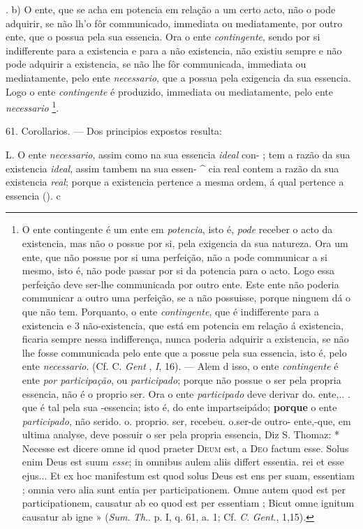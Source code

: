 . b) O ente, que se acha em potencia em relação a um certo acto, não o pode adquirir, se não lh'o fôr communicado, immediata ou mediatamente, por outro ente, que o possua pela sua essencia. Ora o ente \emph{contingente}, sendo por si indifferente para a existencia e para a não existencia, não existiu sempre e não pode adquirir a existencia, se não lhe fôr communicada, immediata ou mediatamente, pelo ente \emph{necessario}, que a possua pela exigencia da sua essencia. Logo o ente \emph{contingente} é produzido, immediata ou mediatamente, pelo ente \emph{necessario} \footnote{O ente contingente é um ente em \emph{potencia}, isto é, \emph{pode} receber o acto da existencia, mas não o possue por si, pela exigencia da sua natureza. Ora um ente, que não possue por si uma perfeição, não a pode communicar a si mesmo, isto é, não pode passar por si da potencia para o acto. Logo essa perfeição deve ser-lhe communicada por outro ente. Este ente não poderia communicar a outro uma perfeição, se a não possuisse, porque ninguem dá o que não tem. Porquanto, o ente \emph{contingente}, que é indifferente para a existencia e 3 não-existencia, que está em potencia em relação á existencia, ficaria sempre nessa indifferença, nunca poderia adquirir a existencia, se não lhe fosse communicada pelo ente que a possue pela sua essencia, isto é, pelo ente \emph{necessario}. (Cf. C. \emph{Gent} , \emph{I}, 16). --- Alem d isso, o ente \emph{contingente} é ente \emph{por participação}, ou \emph{participado}; porque não possue o ser pela propria essencia, não é o proprio ser. Ora o ente \emph{participado} deve derivar do. ente,.. . que é tal pela sua -essencia; isto é, do ente impartseipádo; \textbf{porque} o ente \emph{participado}, não serido. o. proprio. ser, recebeu. o.ser-de outro- ente,-que, em ultima analyse, deve possuir o ser pela propria essencia, Diz S. Thomaz: * Necesse est dicere omne id quod praeter \textsc{Deum} est, a \textsc{Deo} factum esse. Solus enim Deus est suum \emph{esse}; in omnibus aulem aliis differt essentia. rei et esse ejus... Et ex hoc manifestum est quod solus Deus est ens per suam, essentiam ; omnia vero alia sunt entia per participationem. Omne autem quod est per participationem, causatur ab eo quod est per essentiam ; Bicut omne ignitum causatur ab igne » (\emph{Sum}. \emph{Th}.. p. I, q. 61, a. 1; Cf. \emph{C}. \emph{Gent}., 1,15).}.

 61. Corollarios. --- Dos principios expostos resulta:

L. O ente \emph{necessario}, assim como na sua essencia \emph{ideal} con- ; tem a razão da sua existencia \emph{ideal}, assim tambem na sua essen- \textasciicircum{} cia real contem a razão da sua existencia \emph{real}; porque a existencia pertence a mesma ordem, á qual pertence a essencia (). c


